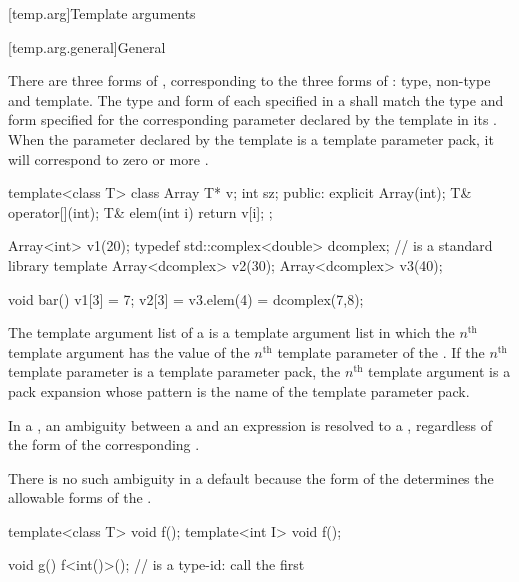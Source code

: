 [temp.arg]{Template arguments}

[temp.arg.general]{General}

\pnum
{}%
There are three forms of
,
corresponding to the three forms of
:
type, non-type and template.
The type and form of each
specified in a
shall match the type and form specified for the corresponding
parameter declared by the template in its
.
When the parameter declared by the template is a template
parameter pack, it will correspond to zero or more
.
\begin{example}
\begin{codeblock}
template<class T> class Array {
  T* v;
  int sz;
public:
  explicit Array(int);
  T& operator[](int);
  T& elem(int i) { return v[i]; }
};

Array<int> v1(20);
typedef std::complex<double> dcomplex;  //  is a standard library template
Array<dcomplex> v2(30);
Array<dcomplex> v3(40);

void bar() {
  v1[3] = 7;
  v2[3] = v3.elem(4) = dcomplex(7,8);
}
\end{codeblock}
\end{example}

\pnum
The template argument list of a  is
a template argument list in which the $n^\text{th}$ template argument
has the value of
the $n^\text{th}$ template parameter of the .
If the $n^\text{th}$ template parameter is
a template parameter pack,
the $n^\text{th}$ template argument is a pack expansion
whose pattern is the name of the template parameter pack.

\pnum
In a
,
an ambiguity between a
and an expression is resolved to a
,
regardless of the form of the corresponding
.
\begin{footnote}
There is no such ambiguity in a default
because the form of the
determines the allowable forms of the
.
\end{footnote}
\begin{example}
\begin{codeblock}
template<class T> void f();
template<int I> void f();

void g() {
  f<int()>();       //  is a type-id: call the first 
}
\end{codeblock}
\end{example}

